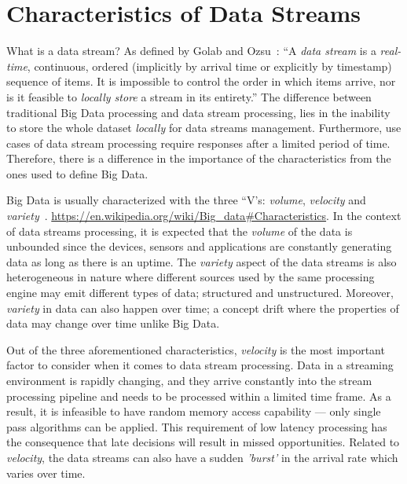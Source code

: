 \section{Characteristics of Data Streams}
\label{sec:characteristics_data_stream}
What is a data stream? As defined by Golab and Ozsu~\cite{golab_data_stream}:
“A \emph{data stream} is a \emph{real-time}, continuous, ordered (implicitly by arrival time 
or explicitly by timestamp) sequence of items. It is impossible to control the order
in which items arrive, nor is it feasible to \emph{locally store} a stream in its entirety.”
The difference between traditional Big Data processing and data stream processing, lies in 
the inability to store the whole dataset \emph{locally} for data streams management. Furthermore, 
use cases of data stream processing require responses after a limited period of time.
Therefore, there is a 
difference in the importance of the characteristics from the ones used to define Big Data.

Big Data is usually characterized with the three “V's: \emph{volume}, \emph{velocity} 
and \emph{variety}~\cite{big_data_analytics}.
 \url{https://en.wikipedia.org/wiki/Big_data#Characteristics}.
In the context of data streams processing, it is expected that the \emph{volume} of 
the data is unbounded since the devices, sensors and applications are constantly 
generating data as long as there is an uptime. The \emph{variety} aspect of the 
data streams is also heterogeneous in nature where different sources used by the same 
processing engine may emit different types of data; structured and unstructured. 
Moreover, \emph{variety} in data can also happen over time; a concept drift where 
the properties of data may change over time unlike Big Data. 

Out of the three aforementioned characteristics, \emph{velocity} is the most important 
factor to consider when it comes to data stream processing. Data in a streaming 
environment is rapidly changing, and they arrive constantly into the stream processing
pipeline and needs to be processed within a limited time frame.
As a result, it is infeasible to have random memory access capability
 --- only single pass algorithms can
be applied. This requirement of low latency processing has the consequence 
that late decisions will result in missed opportunities. Related to \emph{velocity}, 
the data streams can also have a sudden \emph{'burst'} in the arrival rate which varies 
over time. 

